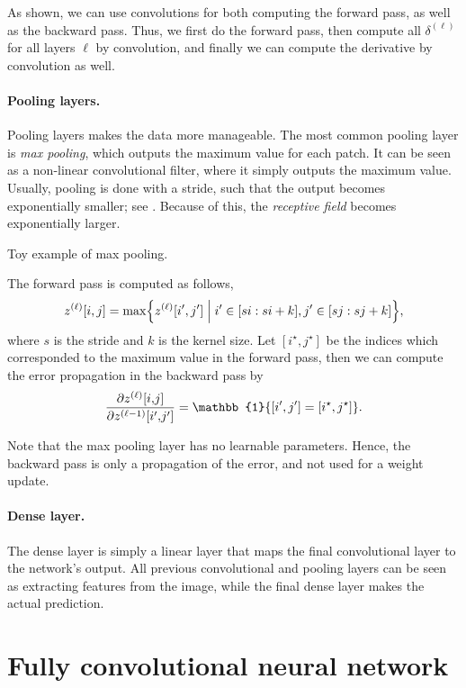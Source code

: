 As shown, we can use convolutions for both computing the forward pass, as well as the backward
pass. Thus, we first do the forward pass, then compute all $\delta^{(\ell)}$ for all layers $\ell$
by convolution, and finally we can compute the derivative by convolution as well.

\paragraph{Pooling layers.}

Pooling layers makes the data more manageable. The most common pooling layer is \textit{max
    pooling}, which outputs the maximum value for each patch. It can be seen as a non-linear
convolutional filter, where it simply outputs the maximum value. Usually, pooling is done with a
stride, such that the output becomes exponentially smaller; see . Because of
this, the \textit{receptive field} becomes exponentially larger.

\begin{marginfigure}
    \centering
    \caption{Toy example of max pooling.}
    \label{fig:max-pooling}
\end{marginfigure}

The forward pass is computed as follows,
\[
    z^{(\ell)}[i,j] = \max \lft\{ z^{(\ell)}[i',j'] \;\middle|\; i' \in [si:si+k], j' \in [sj:sj+k] \rgt\},
\]
where $s$ is the stride and $k$ is the kernel size. Let $[i^\star,j^\star]$ be the indices which
corresponded to the maximum value in the forward pass, then we can compute the error propagation in
the backward pass by \[
    \pdv{z^{(\ell)}[i{,}j]}{z^{(\ell-1)}[i'{,}j']} = \mathbb{1}\{ [i',j'] = [i^\star,j^\star] \}.
\]

Note that the max pooling layer has no learnable parameters. Hence, the backward pass is only a
propagation of the error, and not used for a weight update.

\paragraph{Dense layer.}

The dense layer is simply a linear layer that maps the final convolutional layer to the network's
output. All previous convolutional and pooling layers can be seen as extracting features from the
image, while the final dense layer makes the actual prediction.

\section{Fully convolutional neural network}

